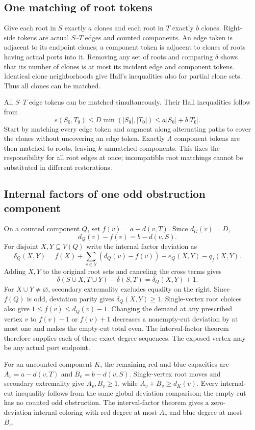 \documentclass[11pt,a4paper]{article}
\theoremstyle{definition}
\begin{document}
\subsection{One matching of root tokens}
Give each root in $S$ exactly $a$ clones and each root in $T$ exactly $b$ clones. Right-side tokens are actual $S$--$T$ edges and counted components. An edge token is adjacent to its endpoint clones; a component token is adjacent to clones of roots having actual ports into it. Removing any set of roots and comparing $\delta$ shows that its number of clones is at most its incident edge and component tokens. Identical clone neighborhoods give Hall's inequalities also for partial clone sets. Thus all clones can be matched.

All $S$--$T$ edge tokens can be matched simultaneously. Their Hall inequalities follow from
\[
 e(S_0,T_0)\le D\min(|S_0|,|T_0|)
 \le a|S_0|+b|T_0|.
\]
Start by matching every edge token and augment along alternating paths to cover the clones without uncovering an edge token. Exactly $\Lambda$ component tokens are then matched to roots, leaving $k$ unmatched components. This fixes the responsibility for all root edges at once; incompatible root matchings cannot be substituted in different restorations.

\subsection{Internal factors of one odd obstruction component}
On a counted component $Q$, set $f(v)=a-d(v,T)$. Since $d_G(v)=D$,
\[
 d_Q(v)-f(v)=b-d(v,S).
\]
For disjoint $X,Y\subseteq V(Q)$ write the internal factor deviation as
\[
 \delta_Q(X,Y)=f(X)+\sum_{v\in Y}(d_Q(v)-f(v))
                  -e_Q(X,Y)-q_f(X,Y).
\]
Adding $X,Y$ to the original root sets and canceling the cross terms gives
\[
 \delta(S\cup X,T\cup Y)-\delta(S,T)=\delta_Q(X,Y)+1.
\]
For $X\cup Y\ne\varnothing$, secondary extremality excludes equality on the right. Since $f(Q)$ is odd, deviation parity gives $\delta_Q(X,Y)\ge1$. Single-vertex root choices also give $1\le f(v)\le d_Q(v)-1$. Changing the demand at any prescribed vertex $v$ to $f(v)-1$ or $f(v)+1$ decreases a nonempty-cut deviation by at most one and makes the empty-cut total even. The interval-factor theorem therefore supplies each of these exact degree sequences. The exposed vertex may be any actual port endpoint.

For an uncounted component $K$, the remaining red and blue capacities are $A_v=a-d(v,T)$ and $B_v=b-d(v,S)$. Single-vertex root moves and secondary extremality give $A_v,B_v\ge1$, while $A_v+B_v\ge d_K(v)$. Every internal-cut inequality follows from the same global deviation comparison; the empty cut has no counted odd obstruction. The interval-factor theorem gives a zero-deviation internal coloring with red degree at most $A_v$ and blue degree at most $B_v$.
\end{document}
